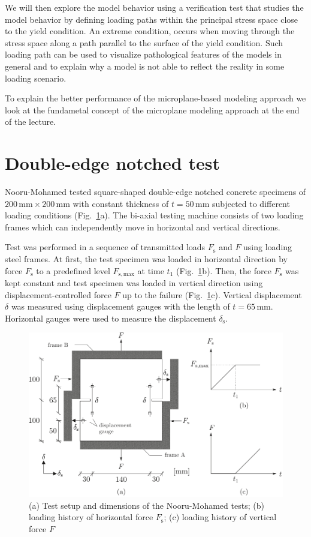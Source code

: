 \documentclass[main.tex]{subfiles}
\begin{document}
We will then explore the model behavior using a verification test that studies the model behavior 
by defining loading paths within the principal stress space close to the yield condition. 
An extreme condition, occurs when moving through the stress space along a path parallel to the surface 
of the yield condition. Such loading path can be used to 
visualize pathological features of the models in general and to explain why a model is not able
to reflect the reality in some loading scenario.

To explain the better performance of the microplane-based modeling approach
we look at the fundametal concept of the microplane modeling approach at the end of the lecture.

\section{Double-edge notched test}

 Nooru-Mohamed \cite{nooru_mixed_1992} tested square-shaped double-edge notched concrete 
specimens of $200\,\mathrm{mm} \times 200\,\mathrm{mm}$ with constant thickness 
of $t=50\,\mathrm{mm}$ subjected to different loading conditions (Fig.~\ref{FIGnoorumodamedtests}a). 
The bi-axial testing machine consists of two loading frames which can independently 
move in horizontal and vertical directions. 

Test was performed in a sequence 
of transmitted loads $F_\mathrm{s}$ and $F$ using loading steel frames. At first, 
the test specimen was loaded in horizontal direction by force $F_\mathrm{s}$  
to a predefined level $F_\mathrm{s,max}$ at time $t_1$  (Fig.~\ref{FIGnoorumodamedtests}b). 
Then, the force $F_\mathrm{s}$  was kept constant and test specimen was loaded in vertical 
direction using displacement-controlled force $F$ up to the failure (Fig.~\ref{FIGnoorumodamedtests}c). 
Vertical displacement $\delta$ was measured using displacement gauges with the length 
of $t=65\,\mathrm{mm}$. Horizontal gauges were used to measure the displacement $\delta_\mathrm{s}$.

\begin{figure}
        \centering
        \includegraphics[width=12cm]{fig/nooru-mohamed-test-setup.pdf}
        \caption{(a) Test setup and dimensions of the Nooru-Mohamed tests; (b) loading history of horizontal force $F_\mathrm{s}$; (c) loading history of vertical force $F$}
        \label{FIGnoorumodamedtests}
\end{figure}
\end{document}

